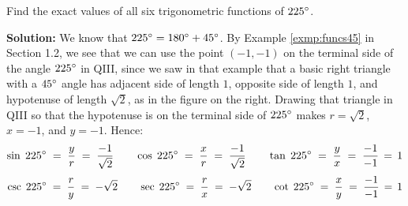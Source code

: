 \begin{exmp}\label{exmp:funcs225}
\noindent Find the exact values of all six trigonometric functions of $225^\circ$.\vspace{1mm}
 \par\noindent\textbf{Solution:} We know that $225^\circ = 180^\circ + 45^\circ$. By
 Example \ref{exmp:funcs45} in Section 1.2, we see that we can use the point $(-1,-1)$ on
 the terminal side of the angle $225^\circ$ in QIII, since we saw in that example that a basic
 right triangle with a $45^\circ$ angle has adjacent side of length $1$, opposite side of length
 $1$, and hypotenuse of length $\sqrt{2}$, as in the figure on the right. Drawing that triangle in
 QIII so that the hypotenuse is on the terminal side of $225^\circ$ makes $r = \sqrt{2}$, $x=-1$,
 and $y=-1$. Hence:
 \begin{displaymath}
  \sin\;225\Degrees \;=\; \dfrac{y}{r} \;=\; \dfrac{-1}{\sqrt{2}} \qquad
  \cos\;225\Degrees \;=\; \dfrac{x}{r} \;=\; \dfrac{-1}{\sqrt{2}} \qquad
  \tan\;225\Degrees \;=\; \dfrac{y}{x} \;=\; \dfrac{-1}{-1} \,=\, 1\vspace{1mm}
 \end{displaymath}
 \begin{displaymath}
  \csc\;225\Degrees \;=\; \dfrac{r}{y} \;=\; -\sqrt{2} \qquad
  \sec\;225\Degrees \;=\; \dfrac{r}{x} \;=\; -\sqrt{2} \qquad
  \cot\;225\Degrees \;=\; \dfrac{x}{y} \;=\; \dfrac{-1}{-1} \,=\, 1\vspace{1mm}
 \end{displaymath}
\end{exmp}\vspace{-4mm}
